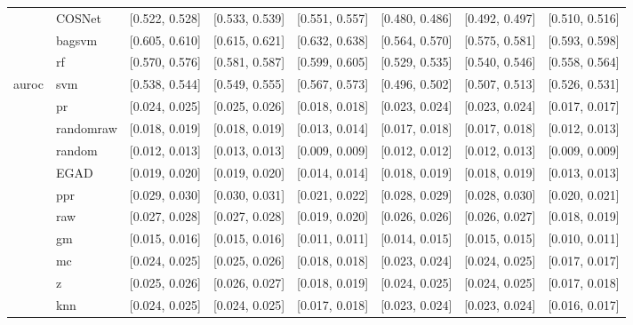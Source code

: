 \begin{table}[H]
{\begin{tabular}{llllllll}
 & COSNet & [0.522, 0.528] & [0.533, 0.539] & [0.551, 0.557] & [0.480, 0.486] & [0.492, 0.497] & [0.510, 0.516]\\

 & bagsvm & [0.605, 0.610] & [0.615, 0.621] & [0.632, 0.638] & [0.564, 0.570] & [0.575, 0.581] & [0.593, 0.598]\\

 & rf & [0.570, 0.576] & [0.581, 0.587] & [0.599, 0.605] & [0.529, 0.535] & [0.540, 0.546] & [0.558, 0.564]\\

\multirow{-15}{*}{\raggedright\arraybackslash auroc} & svm & [0.538, 0.544] & [0.549, 0.555] & [0.567, 0.573] & [0.496, 0.502] & [0.507, 0.513] & [0.526, 0.531]\\
\cmidrule{1-8}
 & pr & [0.024, 0.025] & [0.025, 0.026] & [0.018, 0.018] & [0.023, 0.024] & [0.023, 0.024] & [0.017, 0.017]\\

 & randomraw & [0.018, 0.019] & [0.018, 0.019] & [0.013, 0.014] & [0.017, 0.018] & [0.017, 0.018] & [0.012, 0.013]\\

 & random & [0.012, 0.013] & [0.013, 0.013] & [0.009, 0.009] & [0.012, 0.012] & [0.012, 0.013] & [0.009, 0.009]\\

 & EGAD & [0.019, 0.020] & [0.019, 0.020] & [0.014, 0.014] & [0.018, 0.019] & [0.018, 0.019] & [0.013, 0.013]\\

 & ppr & [0.029, 0.030] & [0.030, 0.031] & [0.021, 0.022] & [0.028, 0.029] & [0.028, 0.030] & [0.020, 0.021]\\

 & raw & [0.027, 0.028] & [0.027, 0.028] & [0.019, 0.020] & [0.026, 0.026] & [0.026, 0.027] & [0.018, 0.019]\\

 & gm & [0.015, 0.016] & [0.015, 0.016] & [0.011, 0.011] & [0.014, 0.015] & [0.015, 0.015] & [0.010, 0.011]\\

 & mc & [0.024, 0.025] & [0.025, 0.026] & [0.018, 0.018] & [0.023, 0.024] & [0.024, 0.025] & [0.017, 0.017]\\

 & z & [0.025, 0.026] & [0.026, 0.027] & [0.018, 0.019] & [0.024, 0.025] & [0.024, 0.025] & [0.017, 0.018]\\

 & knn & [0.024, 0.025] & [0.024, 0.025] & [0.017, 0.018] & [0.023, 0.024] & [0.023, 0.024] & [0.016, 0.017]\\


\end{tabular}}
\end{table}
